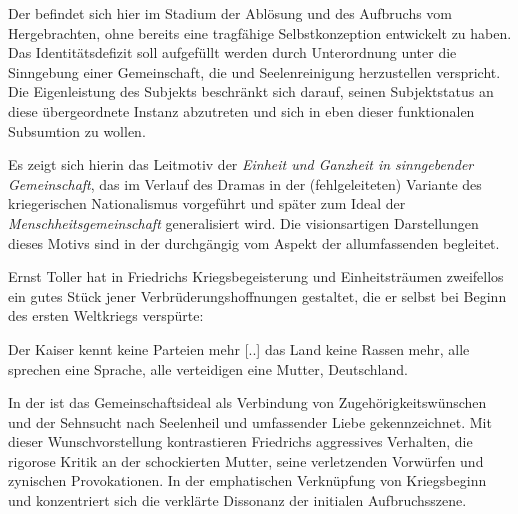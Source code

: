 Der \Cite{Suchende} befindet sich hier im Stadium der Ablösung und des Aufbruchs
vom Hergebrachten, ohne bereits eine tragfähige Selbstkonzeption entwickelt zu
haben. 
Das Identitätsdefizit soll aufgefüllt werden durch Unterordnung unter die
Sinngebung einer Gemeinschaft, die \Cite{Einheit} und Seelenreinigung
herzustellen verspricht. Die Eigenleistung des Subjekts beschränkt sich
darauf, seinen Subjektstatus an diese übergeordnete Instanz abzutreten und
sich in eben dieser funktionalen Subsumtion \Cite{beweisen} 
zu wollen.

Es zeigt sich hierin das Leitmotiv der \emph{Einheit und Ganzheit in
  sinngebender Gemeinschaft}, das im Verlauf des Dramas in der (fehlgeleiteten)
Variante des kriegerischen Nationalismus vorgeführt und später zum Ideal der
\emph{Menschheitsgemeinschaft} generalisiert wird. Die visionsartigen
Darstellungen dieses Motivs sind in der  durchgängig vom
Aspekt der allumfassenden \Cite{Liebe} begleitet.

Ernst Toller hat in Friedrichs Kriegsbegeisterung und Einheitsträumen
zweifellos ein gutes Stück jener Verbrüderungshoffnungen gestaltet, die er
selbst bei Beginn des ersten Weltkriegs verspürte:

\begin{BlockQuote}
  Der Kaiser kennt keine Parteien mehr [..] das Land keine Rassen mehr, alle
  sprechen eine Sprache, alle verteidigen eine Mutter,
  Deutschland.
\end{BlockQuote}
In der  ist das Gemeinschaftsideal als Verbindung von
Zugehörigkeitswünschen und der Sehnsucht nach Seelenheil und umfassender Liebe
gekennzeichnet.  Mit dieser Wunschvorstellung kontrastieren
Friedrichs aggressives Verhalten, die rigorose Kritik an der schockierten
Mutter, seine verletzenden Vorwürfen und zynischen Provokationen. In der
emphatischen Verknüpfung von Kriegsbeginn und \Cite{Abend der Liebe}
konzentriert sich die verklärte Dissonanz der initialen
Aufbruchsszene.

